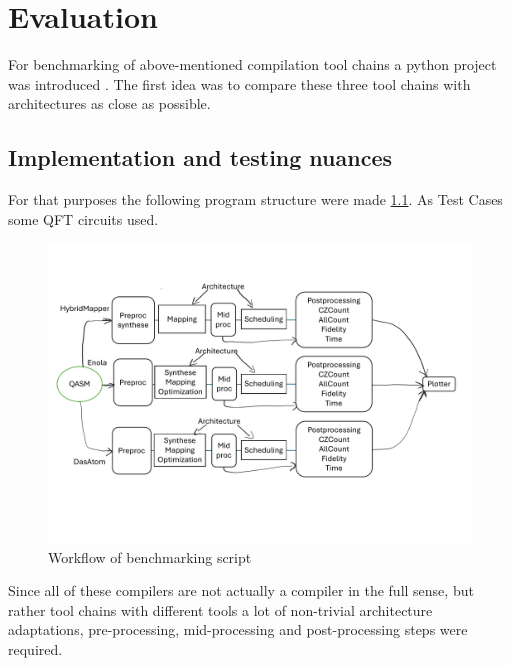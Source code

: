 
\chapter{Evaluation}\label{chapter:evaluation}
For benchmarking of above-mentioned compilation tool chains a python project was introduced \parencite{Emil_Khusainov_Bachelor_GIT}.
The first idea was to compare these three tool chains with architectures as close as possible.
\section{Implementation and testing nuances}
For that purposes the following program structure were made \ref{fig:overview}.
As Test Cases some \ac{QFT} circuits used.
\begin{figure}[htbp]
  \centering
    \includegraphics[width=1.0\textwidth]{figures/schema.pdf}
    \caption{Workflow of benchmarking script}
    \label{fig:overview}
\end{figure}
Since all of these compilers are not actually a compiler in the full sense, but rather tool chains with different tools
a lot of non-trivial architecture adaptations, pre-processing, mid-processing and post-processing steps were required. 

